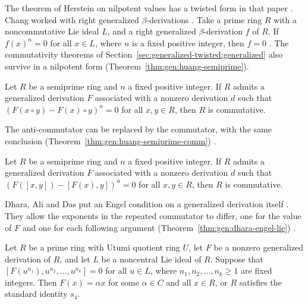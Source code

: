 The theorem of Herstein on nilpotent values has a twisted form in that paper
\cite[p.~893]{Huang2018}. Chang worked with right generalized
$\beta$-derivations \cite[p.~893]{Huang2018}. Take a prime ring $R$ with a
noncommutative Lie ideal $L$, and a right generalized $\beta$-derivation $f$ of
$R$. If $f(x)^{n}=0$ for all $x\in L$, where $n$ is a fixed positive integer,
then $f=0$ \cite[p.~893]{Huang2018}. The commutativity theorems
of Section~\ref{sec:generalized-twisted:generalized} also survive in a
nilpotent form \cite[pp.~893--894]{Huang2018} (Theorem~\ref{thm:gen:huang-semiprime}).

\begin{theorem}\label{thm:gen:huang-semiprime}
Let $R$ be a semiprime ring and $n$ a fixed positive integer. If $R$ admits
a generalized derivation $F$ associated with a nonzero derivation $d$ such
that $(F(x\circ y)-F(x)\circ y)^{n}=0$ for all $x,y\in R$, then $R$ is
commutative.
\end{theorem}

The anti-commutator can be replaced by the commutator, with the same
conclusion (Theorem~\ref{thm:gen:huang-semiprime-comm}) \cite[p.~894]{Huang2018}.

\begin{theorem}\label{thm:gen:huang-semiprime-comm}
Let $R$ be a semiprime ring and $n$ a fixed positive integer. If $R$ admits
a generalized derivation $F$ associated with a nonzero derivation $d$ such
that $(F([x,y])-[F(x),y])^{n}=0$ for all $x,y\in R$, then $R$ is
commutative.
\end{theorem}

Dhara, Ali and Das put an Engel condition on a generalized derivation itself
\cite[p.~1]{DharaAliDas2016}. They allow the exponents in the repeated commutator
to differ, one for the value of $F$ and one for each following argument (Theorem~\ref{thm:gen:dhara-engel-lie})
\cite[p.~1]{DharaAliDas2016}.\begin{theorem}\label{thm:gen:dhara-engel-lie}
Let $R$ be a prime ring with Utumi quotient ring $U$, let $F$ be a nonzero
generalized derivation of $R$, and let $L$ be a noncentral Lie ideal of $R$.
Suppose that $[F(u^{n_{1}}),u^{n_{2}},\dots,u^{n_{k}}]=0$ for all $u\in L$, where
$n_{1},n_{2},\dots,n_{k}\ge 1$ are fixed integers. Then $F(x)=\alpha x$ for some
$\alpha\in C$ and all $x\in R$, or $R$ satisfies the standard identity $s_{4}$.
\end{theorem}

